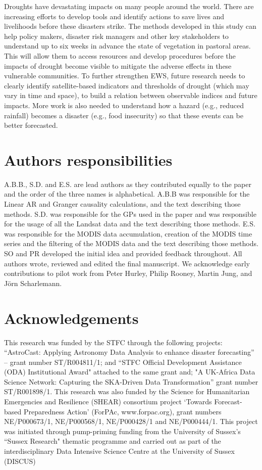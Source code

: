 \documentclass[review]{elsarticle}
\begin{document}
Droughts have devastating impacts on many people around the world. There are increasing efforts to develop tools and identify actions to save lives and livelihoods before these disasters strike. The methods developed in this study can help policy makers, disaster risk managers and other key stakeholders to understand up to six weeks in advance the state of vegetation in pastoral areas. This will allow them to access resources and develop procedures before the impacts of drought become visible to mitigate the adverse effects in these vulnerable communities. To further strengthen EWS, future research needs to clearly identify satellite-based indicators and thresholds of drought (which may vary in time and space), to build a relation between observable indices and future impacts. More work is also needed to understand how a hazard (e.g., reduced rainfall) becomes a disaster (e.g., food insecurity) so that these events can be better forecasted.




\section*{Authors responsibilities}
A.B.B., S.D. and E.S. are lead authors as they contributed equally to the paper and the order of the three names is alphabetical. A.B.B was responsible for the Linear AR and Granger causality calculations, and the text describing those methods. S.D. was responsible for the GPs used in the paper and was responsible for the usage of all the Landsat data and the text describing those methods. E.S. was responsible for the MODIS data accumulation, creation of the MODIS time series and the filtering of the MODIS data and the text describing those methods. SO and PR developed the initial idea and provided feedback throughout. All authors wrote, reviewed and edited the final manuscript. We acknowledge early contributions to pilot work from Peter Hurley, Philip Rooney, Martin Jung, and J\"{o}rn Scharlemann.

\section*{Acknowledgements}
This research was funded by the STFC through the following projects: ``AstroCast: Applying Astronomy Data Analysis to enhance disaster forecasting'' -- grant number ST/R004811/1; and ``STFC Official Development Assistance (ODA) Institutional Award" attached to the same grant and; "A UK-Africa Data Science Network: Capturing the SKA-Driven Data Transformation'' grant number ST/R001898/1. This research was also funded by the Science for Humanitarian Emergencies and Resilience (SHEAR) consortium project ‘Towards Forecast-based Preparedness Action’ (ForPAc, www.forpac.org), grant numbers NE/P000673/1, NE/P000568/1, NE/P000428/1 and NE/P000444/1. This project was initiated through pump-priming funding from the University of Sussex's ``Sussex Research" thematic programme and carried out as part of the interdisciplinary Data Intensive Science Centre at the University of Sussex (DISCUS)
\end{document}
